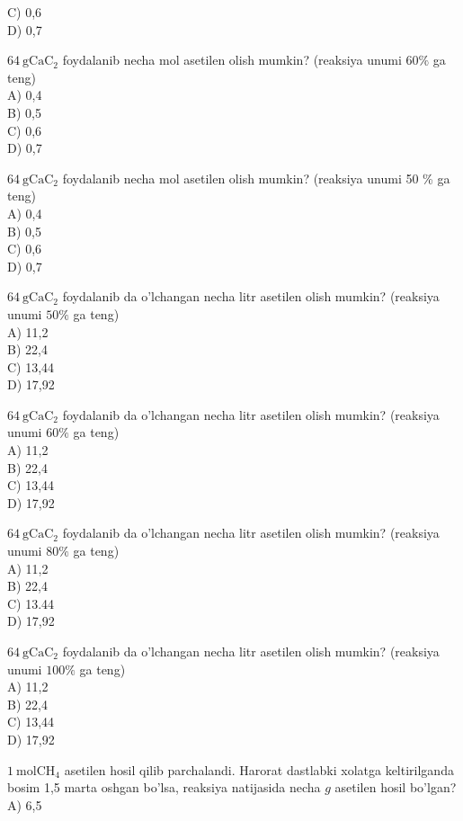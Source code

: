 C) 0,6\\
D) 0,7
  \item $64 \mathrm{~g} \mathrm{CaC}_{2}$ foydalanib necha mol asetilen olish mumkin? (reaksiya unumi $60 \%$ ga teng)\\
A) 0,4\\
B) 0,5\\
C) 0,6\\
D) 0,7
  \item $64 \mathrm{~g} \mathrm{CaC}_{2}$ foydalanib necha mol asetilen olish mumkin? (reaksiya unumi 50 \% ga teng)\\
A) 0,4\\
B) 0,5\\
C) 0,6\\
D) 0,7
  \item $64 \mathrm{~g} \mathrm{CaC}_{2}$ foydalanib da o'lchangan necha litr asetilen olish mumkin? (reaksiya unumi $50 \%$ ga teng)\\
A) 11,2\\
B) 22,4\\
C) 13,44\\
D) 17,92
  \item $64 \mathrm{~g} \mathrm{CaC}_{2}$ foydalanib da o'lchangan necha litr asetilen olish mumkin? (reaksiya unumi $60 \%$ ga teng)\\
A) 11,2\\
B) 22,4\\
C) 13,44\\
D) 17,92
  \item $64 \mathrm{~g} \mathrm{CaC}_{2}$ foydalanib da o'lchangan necha litr asetilen olish mumkin? (reaksiya unumi $80 \%$ ga teng)\\
A) 11,2\\
B) 22,4\\
C) 13.44\\
D) 17,92
  \item $64 \mathrm{~g} \mathrm{CaC}_{2}$ foydalanib da o'lchangan necha litr asetilen olish mumkin? (reaksiya unumi $100 \%$ ga teng)\\
A) 11,2\\
B) 22,4\\
C) 13,44\\
D) 17,92
  \item $1 \mathrm{~mol} \mathrm{CH}_{4}$ asetilen hosil qilib parchalandi. Harorat dastlabki xolatga keltirilganda bosim 1,5 marta oshgan bo'lsa, reaksiya natijasida necha $g$ asetilen hosil bo'lgan?\\
A) 6,5\\
